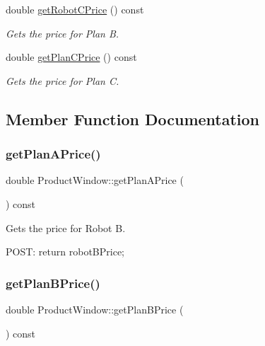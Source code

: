 \begin{DoxyCompactItemize}
double \mbox{\hyperlink{class_product_window_a66832cd0d36260949da84db6afa21a92}{get\+Robot\+C\+Price}} () const
\begin{DoxyCompactList}\small\item\em Gets the price for Plan B. \end{DoxyCompactList}\item 
double \mbox{\hyperlink{class_product_window_a6236c105e5feffeb6bc778ea7f936939}{get\+Plan\+C\+Price}} () const
\begin{DoxyCompactList}\small\item\em Gets the price for Plan C. \end{DoxyCompactList}\end{DoxyCompactItemize}


\subsection{Member Function Documentation}
\mbox{\label{class_product_window_afdeb02aa3514967090ef6d70b5407e0b}} 
\subsubsection{\texorpdfstring{get\+Plan\+A\+Price()}{getPlanAPrice()}}
{\footnotesize\ttfamily double Product\+Window\+::get\+Plan\+A\+Price (\begin{DoxyParamCaption}{ }\end{DoxyParamCaption}) const}



Gets the price for Robot B. 

P\+O\+ST\+: return robot\+B\+Price; \mbox{\label{class_product_window_a689a1bac6a244deffa68721fd8010835}} 
\subsubsection{\texorpdfstring{get\+Plan\+B\+Price()}{getPlanBPrice()}}
{\footnotesize\ttfamily double Product\+Window\+::get\+Plan\+B\+Price (\begin{DoxyParamCaption}{ }\end{DoxyParamCaption}) const}



